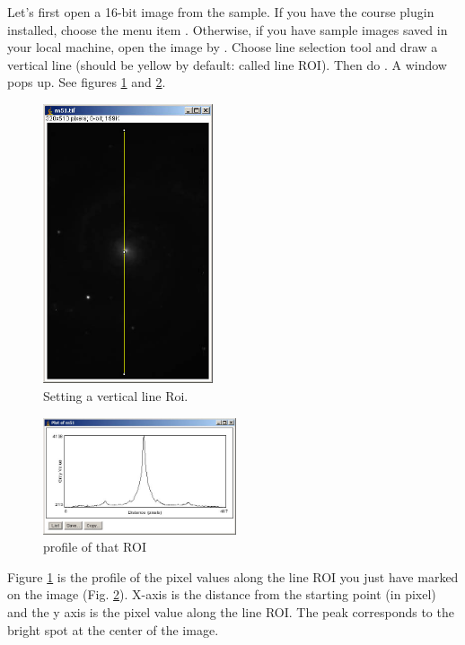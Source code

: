 \begin{indentexercise}{1}
Let's first open a 16-bit image from the sample. 
If you have the course plugin installed, choose the menu item . Otherwise, if you have sample images saved in your local machine, open the image by . Choose line selection tool and draw a vertical line 
(should be yellow by default: called line ROI). Then do . 
A window pops up. See figures \ref{fig:img6} and \ref{fig:img7}.

\begin{figure}[htbp]
\begin{center}
\includegraphics[width=5cm]{fig/CMCIBasicCourse201102-img6.jpg}
\caption{Setting a vertical line Roi.}
\label{fig:img6}
\end{center}
\end{figure}

\begin{figure}[htbp]
\begin{center}
\includegraphics[width=5.694cm,height=3.44cm]{fig/CMCIBasicCourse201102-img7.jpg}
\caption{profile of that ROI}
\label{fig:img7}
\end{center}
\end{figure}

Figure \ref{fig:img6} is the profile of the pixel values along the line ROI 
you just have marked on the image (Fig. \ref{fig:img7}). X-axis is the distance 
from the starting point (in pixel) and the y axis is the pixel value along the line ROI. 
The peak corresponds to the bright spot at the center of the image. 


\end{indentexercise}
